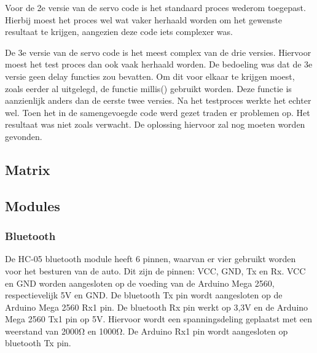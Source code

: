 Voor de 2e versie van de servo code is het standaard proces wederom toegepast. Hierbij moest het proces wel wat vaker herhaald worden om het gewenste resultaat te krijgen, aangezien deze code iets complexer was. 

De 3e versie van de servo code is het meest complex van de drie versies. Hiervoor moest het test proces dan ook vaak herhaald worden. De bedoeling was dat de 3e versie geen delay functies zou bevatten. Om dit voor elkaar te krijgen moest, zoals eerder al uitgelegd, de functie millis() gebruikt worden. Deze functie is aanzienlijk anders dan de eerste twee versies. Na het testproces werkte het echter wel. Toen het in de samengevoegde code werd gezet traden er problemen op. Het resultaat was niet zoals verwacht. De oplossing hiervoor zal nog moeten worden gevonden. 

\subsection{Matrix}
\subsection{Modules}
\subsubsection{Bluetooth}
De HC-05 bluetooth module heeft 6 pinnen, waarvan er vier gebruikt worden voor het besturen van de auto. Dit zijn de pinnen: VCC, GND, \gls{Tx en Rx}. VCC en GND worden aangesloten op de voeding van de Arduino Mega 2560, respectievelijk 5V en GND.  De bluetooth Tx pin wordt aangesloten op de Arduino Mega 2560 Rx1 pin. De bluetooth Rx pin werkt op 3,3V en de Arduino Mega 2560 Tx1 pin op 5V. Hiervoor wordt een spanningsdeling geplaatst met een weerstand van 2000\si{\ohm} en 1000\si{\ohm}. De Arduino Rx1 pin wordt aangesloten op bluetooth Tx pin.

